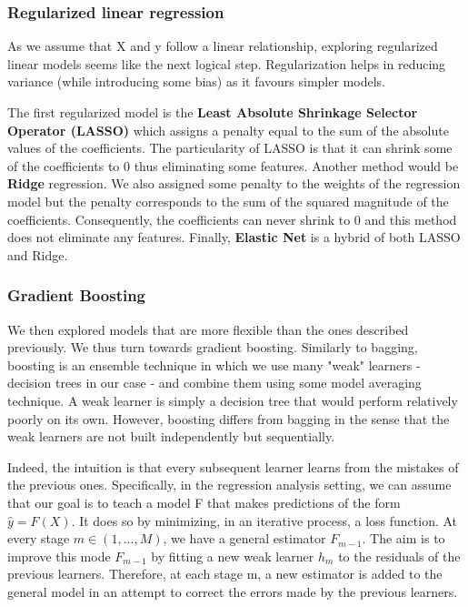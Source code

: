 \documentclass[sigplan,screen]{acmart}
\begin{document}
\subsubsection{Regularized linear regression} As we assume that X and y follow a linear relationship, exploring regularized linear models seems like the next logical step. Regularization helps in reducing variance (while introducing some bias) as it favours simpler models. 

The first regularized model is the \textbf{Least Absolute Shrinkage Selector Operator (LASSO)} which assigns a penalty equal to the sum of the absolute values of the coefficients. The particularity of LASSO is that it can shrink some of the coefficients to 0 thus eliminating some features. Another method would be \textbf{Ridge} regression. We also assigned some penalty to the weights of the regression model but the penalty corresponds to the sum of the squared magnitude of the coefficients. Consequently, the coefficients can never shrink to 0 and this method does not eliminate any features. Finally, \textbf{Elastic Net} is a hybrid of both LASSO and Ridge.

\subsubsection{Gradient Boosting}
We then explored models that are more flexible than the ones described previously. We thus turn towards gradient boosting. Similarly to bagging, boosting is an ensemble technique in which we use many "weak" learners - decision trees in our case -  and combine them using some model averaging technique. A weak learner is simply a decision tree that would perform relatively poorly on its own. However, boosting differs from bagging in the sense that the weak learners are not built independently but sequentially. 

Indeed, the intuition is that every subsequent learner learns from the mistakes of the previous ones. Specifically, in the regression analysis setting, we can assume that our goal is to teach a model F that makes predictions of the form $\hat{y} = F(X)$. It does so by minimizing, in an iterative process, a loss function. At every stage $m \in (1,...,M)$, we have a general estimator $F_{m-1}$. The aim is to improve this mode $F_{m-1}$ by fitting a new weak learner $h_{m}$ to the residuals of the previous learners. Therefore, at each stage m, a new estimator is added to the general model in an attempt to correct the errors made by the previous learners. 
\end{document}
